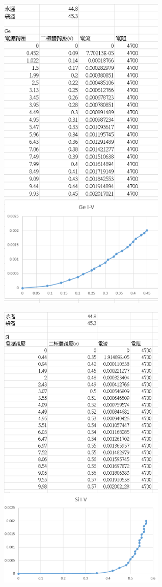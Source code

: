 \documentclass[UTF8]{ctexart}
\begin{document}
\begin{CJK*}{UTF8}{song}
\begin{minipage}[t]{0.48\textwidth}
\centering %
\includegraphics[width = 0.6\textwidth]{45ge.png}
\end{minipage} %
\begin{minipage}[t]{0.48\textwidth}
\centering
\includegraphics[width = 0.6\textwidth]{45si.png}
\end{minipage}
 \\


\end{CJK*}
\end{document}

